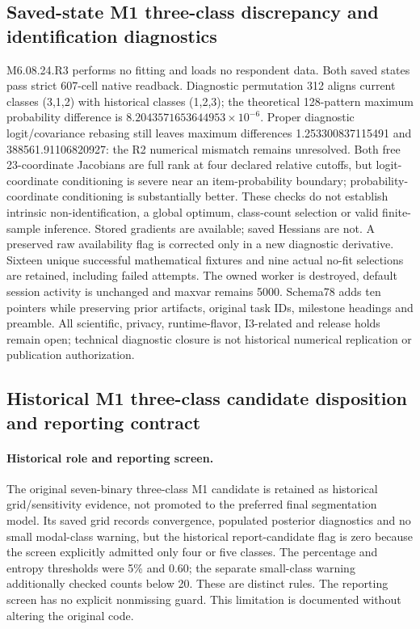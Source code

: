\documentclass[11pt,a4paper]{article}
\begin{document}
\subsection*{Saved-state M1 three-class discrepancy and identification diagnostics}
M6.08.24.R3 performs no fitting and loads no respondent data. Both saved states pass strict 607-cell native readback. Diagnostic permutation 312 aligns current classes (3,1,2) with historical classes (1,2,3); the theoretical 128-pattern maximum probability difference is $8.2043571653644953\times10^{-6}$. Proper diagnostic logit/covariance rebasing still leaves maximum differences 1.253300837115491 and 388561.91106820927: the R2 numerical mismatch remains unresolved. Both free 23-coordinate Jacobians are full rank at four declared relative cutoffs, but logit-coordinate conditioning is severe near an item-probability boundary; probability-coordinate conditioning is substantially better. These checks do not establish intrinsic non-identification, a global optimum, class-count selection or valid finite-sample inference. Stored gradients are available; saved Hessians are not. A preserved raw availability flag is corrected only in a new diagnostic derivative. Sixteen unique successful mathematical fixtures and nine actual no-fit selections are retained, including failed attempts. The owned worker is destroyed, default session activity is unchanged and maxvar remains 5000. Schema78 adds ten pointers while preserving prior artifacts, original task IDs, milestone headings and preamble. All scientific, privacy, runtime-flavor, I3-related and release holds remain open; technical diagnostic closure is not historical numerical replication or publication authorization.

\subsection*{Historical M1 three-class candidate disposition and reporting contract}
\paragraph{Historical role and reporting screen.}
The original seven-binary three-class M1 candidate is retained as historical
grid/sensitivity evidence, not promoted to the preferred final segmentation model.
Its saved grid records convergence, populated posterior diagnostics and no small
modal-class warning, but the historical report-candidate flag is zero because the
screen explicitly admitted only four or five classes. The percentage and entropy
thresholds were 5\% and 0.60; the separate small-class warning additionally checked
counts below 20. These are distinct rules. The reporting screen has no explicit
nonmissing guard. This limitation is documented without altering the original code.
\end{document}
